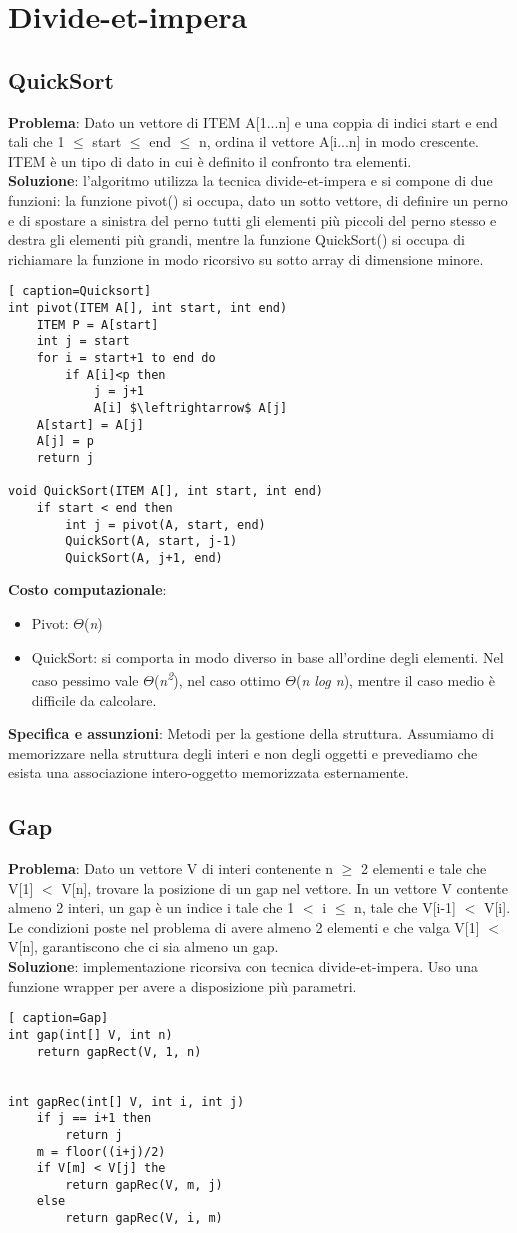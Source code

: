 \documentclass[../cheatSheetAlgoritmi.tex]{subfiles}
\begin{document}
\chapter{Divide-et-impera}
\section{QuickSort}
\label{sec:quicksort}
\textbf{Problema}: Dato un vettore di ITEM A[1...n] e una coppia di indici start e end tali che 1  $\leq$ start  $\leq$ end  $\leq$ n, ordina il vettore A[i...n] in modo crescente. ITEM è un tipo di dato in cui è definito il confronto tra elementi.\\
\textbf{Soluzione}: l'algoritmo utilizza la tecnica divide-et-impera e si compone di due funzioni: la funzione pivot() si occupa, dato un sotto vettore, di definire un perno e di spostare a sinistra del perno tutti gli elementi più piccoli del perno stesso e  destra  gli elementi più grandi, mentre la funzione QuickSort() si occupa di richiamare la funzione in modo ricorsivo su sotto array di dimensione minore.\
\begin{lstlisting}[ caption=Quicksort]
int pivot(ITEM A[], int start, int end)
	ITEM P = A[start]
	int j = start
	for i = start+1 to end do
		if A[i]<p then 
			j = j+1
			A[i] $\leftrightarrow$ A[j]
	A[start] = A[j]
	A[j] = p	
	return j

void QuickSort(ITEM A[], int start, int end)
	if start < end then
		int j = pivot(A, start, end)
		QuickSort(A, start, j-1)
		QuickSort(A, j+1, end)		
\end{lstlisting}
\textbf{Costo computazionale}:
\begin{itemize}
 	\item Pivot: $\Theta$(\textit{n}) 
 	\item QuickSort: si comporta in modo diverso in base all'ordine degli elementi. Nel caso pessimo vale $\Theta$(\textit{n\textsuperscript{2}}), nel caso ottimo  $\Theta$(\textit{n log n}), mentre il caso medio è difficile da calcolare. 
\end{itemize}
\textbf{Specifica e assunzioni}: Metodi per la gestione della struttura. Assumiamo di memorizzare nella struttura degli interi e non degli oggetti e prevediamo che esista una associazione intero-oggetto memorizzata esternamente.\


\section{Gap}
\textbf{Problema}: Dato un vettore V di interi contenente n $\geq$ 2 elementi e tale che V[1] $<$ V[n], trovare la posizione di un gap nel vettore. In un vettore V contente almeno 2 interi, un gap è un indice i tale che 1 $<$ i $\leq$ n, tale che V[i-1] $<$ V[i]. Le condizioni poste nel problema di avere almeno 2 elementi e che valga V[1] $<$ V[n], garantiscono che ci sia almeno un gap.\\
\textbf{Soluzione}: implementazione ricorsiva con tecnica divide-et-impera. Uso una funzione wrapper per avere a disposizione più parametri.
 
\begin{lstlisting}[ caption=Gap]
int gap(int[] V, int n)
	return gapRect(V, 1, n)
	

int gapRec(int[] V, int i, int j)
	if j == i+1 then
		return j
	m = floor((i+j)/2)
	if V[m] < V[j] the
		return gapRec(V, m, j)
	else 
		return gapRec(V, i, m)
\end{lstlisting}
 
\end{document}
